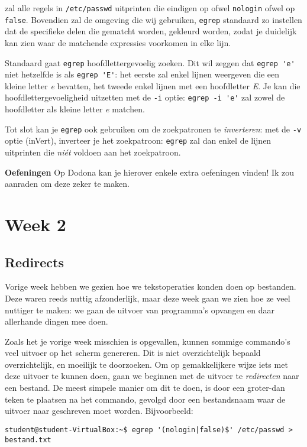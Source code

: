 \documentclass[a4paper,twoside,openany]{memoir}
\begin{document}
zal alle regels in \verb!/etc/passwd! uitprinten die eindigen op ofwel
\verb!nologin! ofwel op \verb!false!. Bovendien zal de omgeving die wij
gebruiken, \verb!egrep! standaard zo instellen dat de specifieke delen die
gematcht worden, gekleurd worden, zodat je duidelijk kan zien waar de matchende
expressies voorkomen in elke lijn.

Standaard gaat \verb!egrep! hoofdlettergevoelig zoeken. Dit wil zeggen dat \verb!egrep 'e'! niet hetzelfde is als \verb!egrep 'E'!: het eerste zal enkel lijnen weergeven die een kleine letter \emph{e} bevatten, het tweede enkel lijnen met een hoofdletter \emph{E}. Je kan die hoofdlettergevoeligheid uitzetten met de \verb!-i! optie: \verb!egrep -i 'e'! zal zowel de hoofdletter als kleine letter \emph{e} matchen.

Tot slot kan je \verb!egrep! ook gebruiken om de zoekpatronen te \emph{inverteren}: met de \verb!-v! optie (inVert), inverteer je het zoekpatroon: \verb!egrep! zal dan enkel de lijnen uitprinten die \emph{ni\'et} voldoen aan het zoekpatroon.

\textbf{Oefeningen} Op Dodona kan je hierover enkele extra oefeningen vinden! Ik zou aanraden om deze zeker te maken.

\part{Week 2}

\chapter{Redirects}

Vorige week hebben we gezien hoe we tekstoperaties konden doen op bestanden.
Deze waren reeds nuttig afzonderlijk, maar deze week gaan we zien hoe ze veel
nuttiger te maken: we gaan de uitvoer van programma's opvangen en daar
allerhande dingen mee doen.

Zoals het je vorige week misschien is opgevallen, kunnen sommige commando's veel
uitvoer op het scherm genereren. Dit is niet overzichtelijk bepaald
overzichtelijk, en moeilijk te doorzoeken. Om op gemakkelijkere wijze iets met
deze uitvoer te kunnen doen, gaan we beginnen met de uitvoer te
\emph{redirecten} naar een bestand. De meest simpele manier om dit te doen, is
door een groter-dan teken te plaatsen na het commando, gevolgd door een
bestandsnaam waar de uitvoer naar geschreven moet worden. Bijvoorbeeld:

\begin{verbatim}
student@student-VirtualBox:~$ egrep '(nologin|false)$' /etc/passwd > bestand.txt
\end{verbatim}
\end{document}
